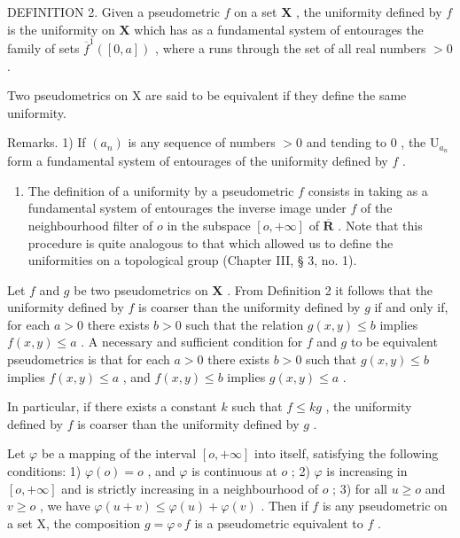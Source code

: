DEFINITION 2. Given a pseudometric \(f\) on a set \(\mathbf{X}\) , the uniformity defined by \(f\) is the uniformity on \(\mathbf{X}\) which has as a fundamental system of entourages the family of sets \(\overline{f}^{1}([0, a])\) , where a runs through the set of all real numbers \(> 0\) .

Two pseudometrics on X are said to be equivalent if they define the same uniformity.

Remarks. 1) If \((a_{n})\) is any sequence of numbers \(>0\) and tending to \(0\) , the \(\mathrm{U}_{a_n}\) form a fundamental system of entourages of the uniformity defined by \(f\) .

\begin{enumerate}
\def\labelenumi{\arabic{enumi})}
\setcounter{enumi}{1}
\tightlist
\item
  The definition of a uniformity by a pseudometric \(f\) consists in taking as a fundamental system of entourages the inverse image under \(f\) of the neighbourhood filter of \(o\) in the subspace \([o, +\infty]\) of \(\overline{\mathbf{R}}\) . Note that this procedure is quite analogous to that which allowed us to define the uniformities on a topological group (Chapter III, § 3, no. 1).
\end{enumerate}

Let \(f\) and \(g\) be two pseudometrics on \(\mathbf{X}\) . From Definition 2 it follows that the uniformity defined by \(f\) is coarser than the uniformity defined by \(g\) if and only if, for each \(a > 0\) there exists \(b > 0\) such that the relation \(g(x, y) \leqslant b\) implies \(f(x, y) \leqslant a\) . A necessary and sufficient condition for \(f\) and \(g\) to be equivalent pseudometrics is that for each \(a > 0\) there exists \(b > 0\) such that \(g(x, y) \leqslant b\) implies \(f(x, y) \leqslant a\) , and \(f(x, y) \leqslant b\) implies \(g(x, y) \leqslant a\) .

In particular, if there exists a constant \(k\) such that \(f \leqslant kg\) , the uniformity defined by \(f\) is coarser than the uniformity defined by \(g\) .

Let \(\varphi\) be a mapping of the interval \([o, +\infty]\) into itself, satisfying the following conditions: 1) \(\varphi(o) = o\) , and \(\varphi\) is continuous at \(o\) ; 2) \(\varphi\) is increasing in \([o, +\infty]\) and is strictly increasing in a neighbourhood of \(o\) ; 3) for all \(u \geqslant o\) and \(v \geqslant o\) , we have \(\varphi(u + v) \leqslant \varphi(u) + \varphi(v)\) . Then if \(f\) is any pseudometric on a set X, the composition \(g = \varphi \circ f\) is a pseudometric equivalent to \(f\) .

